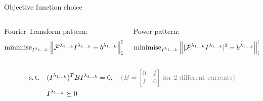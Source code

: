 \documentclass[../main.tex]{subfiles}
\begin{document}
%
%



\begin{frame}[t]{Objective function choice}

\begin{columns}[t]
\begin{column}{0.5\textwidth}
    Fourier Transform pattern:
    \begin{equation*}
    \operatorname{minimise}_{I^{\lambda_{1\ldots k}}} \Big\| \mathcal{F}^{\lambda_{1 \ldots k}} I^{\lambda_{1\ldots k}} - b^{\lambda_{1 \ldots k}} \Big\|_2^2
    \end{equation*}


\end{column}
\begin{column}{0.5\textwidth}
    Power pattern:
    \begin{equation*}
    \operatorname{minimise}_{I^{\lambda_{1\ldots k}}}  \Big\| |\mathcal{F}^{\lambda_{1 \ldots k}} I^{\lambda_{1\ldots k}}|^2 - b^{\lambda_{1 \ldots k}} \Big\|_2^2
    \end{equation*}
\end{column}
\end{columns}

\begin{equation*}
\begin{aligned}
& \st
& & (I^{\lambda_{1\ldots k}})^T B I^{\lambda_{1\ldots k}} = 0, \quad \text{\textcolor{gray}{($B=\begin{bmatrix} 0 & I \\ I & 0\end{bmatrix}$ for $2$ different currents)}} \\
&&& I^{\lambda_{1\ldots k}} \succeq 0 \\
\end{aligned}
\end{equation*}


\end{frame}
\end{document}
